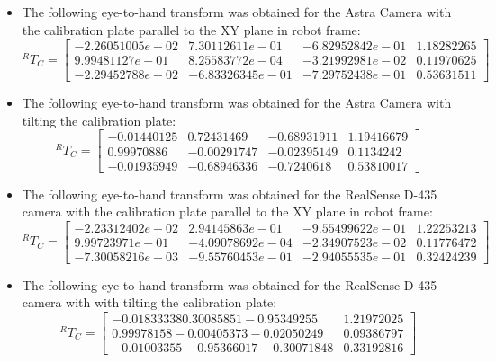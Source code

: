 \begin{itemize}
\item The following eye-to-hand transform was obtained for the Astra Camera with the calibration plate parallel to the XY plane in robot frame:
\begin{equation}
^{R}T_{C}=\begin{bmatrix} -2.26051005e-02 & 7.30112611e-01 & -6.82952842e-01 & 1.18282265\\9.99481127e-01 & 8.25583772e-04 & -3.21992981e-02 & 0.11970625\\ -2.29452788e-02 & -6.83326345e-01 & -7.29752438e-01 & 0.53631511 \end{bmatrix}
\end{equation}

\item The following eye-to-hand transform was obtained for the Astra Camera with tilting the calibration plate:
\begin{equation}
^{R}T_{C}=\begin{bmatrix} -0.01440125 & 0.72431469 & -0.68931911 & 1.19416679\\0.99970886 & -0.00291747 & -0.02395149 & 0.1134242\\ -0.01935949 & -0.68946336 & -0.7240618 & 0.53810017 \end{bmatrix}
\end{equation}



\item The following eye-to-hand transform was obtained for the RealSense D-435 camera with the calibration plate parallel to the XY plane in robot frame:
\begin{equation}
^{R}T_{C}=\begin{bmatrix} -2.23312402e-02 & 2.94145863e-01 & -9.55499622e-01 &1.22253213\\9.99723971e-01 & -4.09078692e-04 & -2.34907523e-02 & 0.11776472 \\ -7.30058216e-03 & -9.55760453e-01 & -2.94055535e-01 & 0.32424239  \end{bmatrix}
\end{equation}



\item The following eye-to-hand transform was obtained for the RealSense D-435 camera with with tilting the calibration plate:
\begin{equation}
^{R}T_{C}=\begin{bmatrix} -0.01833338  0.30085851 -0.95349255 & 1.21972025\\0.99978158 -0.00405373 -0.02050249& 0.09386797\\ -0.01003355 -0.95366017 -0.30071848& 0.33192816\end{bmatrix}
\end{equation}





\end{itemize}











